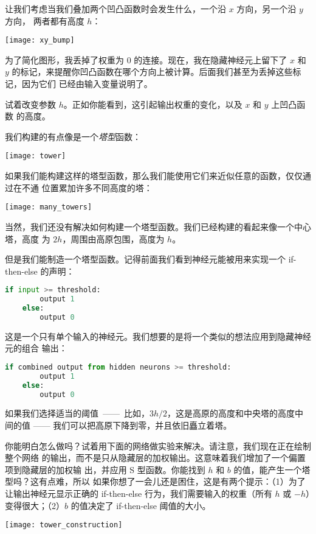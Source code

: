 让我们考虑当我们叠加两个凹凸函数时会发生什么，一个沿 $x$ 方向，另一个沿 $y$ 方向，
两者都有高度 $h$：
\begin{center}
  \texttt{[image: xy\_bump]}
\end{center}

为了简化图形，我丢掉了权重为 $0$ 的连接。现在，我在隐藏神经元上留下了 $x$ 和 $y$
的标记，来提醒你凹凸函数在哪个方向上被计算。后面我们甚至为丢掉这些标记，因为它们
已经由输入变量说明了。

试着改变参数 $h$。正如你能看到，这引起输出权重的变化，以及 $x$ 和 $y$ 上凹凸函数
的高度。

我们构建的有点像是一个\emph{塔型}函数：
\begin{center}
  \texttt{[image: tower]}
\end{center}

如果我们能构建这样的塔型函数，那么我们能使用它们来近似任意的函数，仅仅通过在不通
位置累加许多不同高度的塔：
\begin{center}
  \texttt{[image: many\_towers]}
\end{center}

当然，我们还没有解决如何构建一个塔型函数。我们已经构建的看起来像一个中心塔，高度
为 $2h$，周围由高原包围，高度为 $h$。

但是我们能制造一个塔型函数。记得前面我们看到神经元能被用来实现一个 {\serif
  if-then-else} 的声明：
\begin{lstlisting}[language=Python]
    if input >= threshold: 
        output 1
    else:
        output 0
\end{lstlisting}

这是一个只有单个输入的神经元。我们想要的是将一个类似的想法应用到隐藏神经元的组合
输出：
\begin{lstlisting}[language=Python]
    if combined output from hidden neurons >= threshold:
        output 1
    else:
        output 0
\end{lstlisting}

如果我们选择适当的阈值~——~比如，$3h/2$，这是高原的高度和中央塔的高度中间的值 ——
我们可以把高原下降到零，并且依旧矗立着塔。

你能明白怎么做吗？试着用下面的网络做实验来解决。请注意，我们现在正在绘制整个网络
的输出，而不是只从隐藏层的加权输出。这意味着我们增加了一个偏置项到隐藏层的加权输
出，并应用 S 型函数。你能找到 $h$ 和 $b$ 的值，能产生一个塔型吗？这有点难，所以
如果你想了一会儿还是困住，这是有两个提示：（1）为了让输出神经元显示正确的{\serif
  if-then-else} 行为，我们需要输入的权重（所有 $h$ 或 $-h$）变得很大；（2）$b$
的值决定了 {\serif if-then-else} 阈值的大小。
\begin{center}
  \texttt{[image: tower\_construction]}
\end{center}

